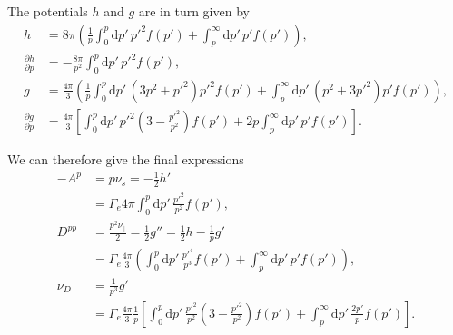 \documentclass[11pt,a4paper]{article}
\newcommand{\rd}{\ensuremath{\mathrm{d}}}
\begin{document}
The potentials $h$ and $g$ are in turn given by
\begin{align}
h &= 8\pi \left( \frac{1}{p}\int_0^p \rd p' \, p'^2 f(p') + \int_p^\infty \rd p' \, p'f(p')\right), \nonumber \\
\frac{\partial h}{\partial p} &= -\frac{8\pi}{p^2}\int_0^p \rd p' \, p'^2 f(p'), \nonumber \\
g &= \frac{4\pi}{3}\left( \frac{1}{p}\int_0^ p \rd p' \,(3p^2+p'^2)p'^2f(p')  + \int_p^\infty \rd p' \,(p^2+3p'^2)p'f(p')\right), \nonumber \\
\frac{\partial g}{\partial p} &= \frac{4\pi}{3}\left[ \int_0^p \rd p'\,p'^2\left(3-\frac{p'^2}{p^2}\right)f(p') + 2p\int_p^\infty \rd p' \, p' f(p')\right] .
\end{align}

We can therefore give the final expressions
\begin{align}
-A^p &= p\nu_s = -\frac{1}{2}h' \nonumber \\
&= \Gamma_e 4\pi \int_0^p \rd p'\,\frac{p'^2}{p^2}f(p'), \nonumber \\
D^{pp} &= \frac{p^2\nu_\parallel}{2} = \frac{1}{2} g'' = \frac{1}{2}h - \frac{1}{p}g' \nonumber \\
&= \Gamma_e \frac{4\pi}{3}\left( \int_0^p \rd p' \, \frac{p'^4}{p^3} f(p') + \int_p^\infty \rd p' \,p' f(p')\right), \nonumber \\
\nu_D &= \frac{1}{p^3}g' \nonumber \\
&= \Gamma_e  \frac{4\pi}{3}\frac{1}{p}\left[ \int_0^p \rd p'\,\frac{p'^2}{p^2}\left(3-\frac{p'^2}{p^2}\right)f(p') +\int_p^\infty \rd p' \, \frac{2p'}{p} f(p')\right] .
\end{align}
\end{document}
